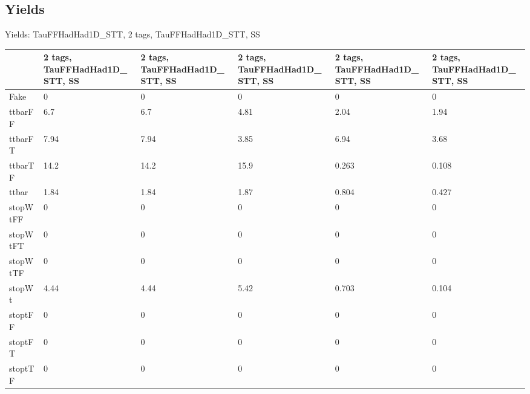 
\subsection{Yields}

\begin{frame}{Yields: TauFFHadHad1D\_STT, 2 tags, TauFFHadHad1D\_STT, SS}
\begin{center}
  \begin{tabular}{l| >{\centering\let\newline\\\arraybackslash\hspace{0pt}}m{1.4cm}| >{\centering\let\newline\\\arraybackslash\hspace{0pt}}m{1.4cm}| >{\centering\let\newline\\\arraybackslash\hspace{0pt}}m{1.4cm}| >{\centering\let\newline\\\arraybackslash\hspace{0pt}}m{1.4cm}| >{\centering\let\newline\\\arraybackslash\hspace{0pt}}m{1.4cm}}
    & 2 tags, TauFFHadHad1D\_STT, SS & 2 tags, TauFFHadHad1D\_STT, SS & 2 tags, TauFFHadHad1D\_STT, SS & 2 tags, TauFFHadHad1D\_STT, SS & 2 tags, TauFFHadHad1D\_STT, SS \\
 \hline \hline
    Fake& 0 & 0 & 0 & 0 & 0 \\
 \hline
    ttbarFF& 6.7 & 6.7 & 4.81 & 2.04 & 1.94 \\
 \hline
    ttbarFT& 7.94 & 7.94 & 3.85 & 6.94 & 3.68 \\
 \hline
    ttbarTF& 14.2 & 14.2 & 15.9 & 0.263 & 0.108 \\
 \hline
    ttbar& 1.84 & 1.84 & 1.87 & 0.804 & 0.427 \\
 \hline
    stopWtFF& 0 & 0 & 0 & 0 & 0 \\
 \hline
    stopWtFT& 0 & 0 & 0 & 0 & 0 \\
 \hline
    stopWtTF& 0 & 0 & 0 & 0 & 0 \\
 \hline
    stopWt& 4.44 & 4.44 & 5.42 & 0.703 & 0.104 \\
 \hline
    stoptFF& 0 & 0 & 0 & 0 & 0 \\
 \hline
    stoptFT& 0 & 0 & 0 & 0 & 0 \\
 \hline
    stoptTF& 0 & 0 & 0 & 0 & 0 \\

\end{tabular}
\end{center}
\end{frame}
